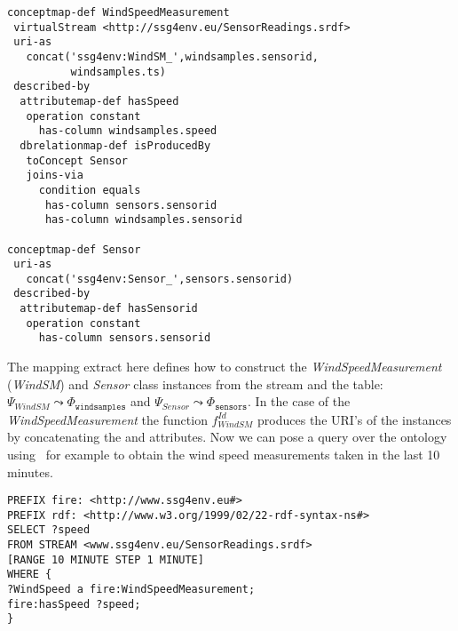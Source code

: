 \begin{lstlisting}[style=R2OStyle,language=R2O,frame=none]
conceptmap-def WindSpeedMeasurement
 virtualStream <http://ssg4env.eu/SensorReadings.srdf>
 uri-as
   concat('ssg4env:WindSM_',windsamples.sensorid,
          windsamples.ts)
 described-by
  attributemap-def hasSpeed
   operation constant
     has-column windsamples.speed
  dbrelationmap-def isProducedBy
   toConcept Sensor
   joins-via
     condition equals
      has-column sensors.sensorid
      has-column windsamples.sensorid

conceptmap-def Sensor
 uri-as
   concat('ssg4env:Sensor_',sensors.sensorid)
 described-by
  attributemap-def hasSensorid
   operation constant
     has-column sensors.sensorid
\end{lstlisting}
%
The mapping extract here defines how to construct the \textit{WindSpeedMeasurement} (\textit{WindSM}) and \textit{Sensor} class instances from the  stream and the  table: \linebreak $\Psi_{WindSM}\leadsto \Phi_{\mathtt{windsamples}}$ and $\Psi_{Sensor}\leadsto \Phi_{\mathtt{sensors}}$. In the case of the \textit{WindSpeedMeasurement} the function $f_{WindSM}^{Id}$ produces the URI's of the instances by concatenating the  and  attributes.
Now we can pose a query over the ontology using \sparqlstr\, for example to obtain the wind speed measurements taken in the last 10 minutes.
\begin{lstlisting}[style=SPARQLSTRStyle,language=SPARQLSTR,frame=none]
PREFIX fire: <http://www.ssg4env.eu#>
PREFIX rdf: <http://www.w3.org/1999/02/22-rdf-syntax-ns#>
SELECT ?speed
FROM STREAM <www.ssg4env.eu/SensorReadings.srdf> 
[RANGE 10 MINUTE STEP 1 MINUTE]
WHERE {
?WindSpeed a fire:WindSpeedMeasurement;
fire:hasSpeed ?speed;
}
\end{lstlisting}

